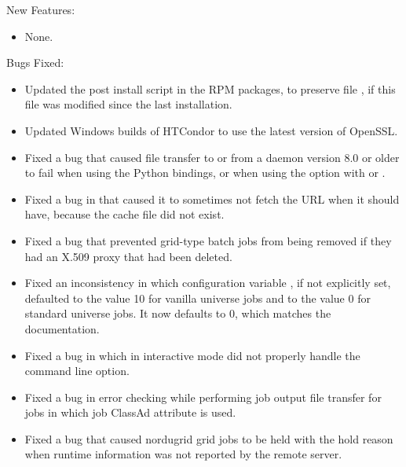 \noindent New Features:

\begin{itemize}

\item None.

\end{itemize}

\noindent Bugs Fixed:

\begin{itemize}

\item Updated the post install script in the RPM packages,
to preserve file , 
if this file was modified since the last installation.

\item Updated Windows builds of HTCondor to use the latest version of OpenSSL.

\item Fixed a bug that caused file transfer to or from a  
daemon version 8.0 or older
to fail when using the Python bindings, or when using
the  option with  or .

\item Fixed a bug in  that caused it to sometimes 
not fetch the URL when it should have,
because the cache file did not exist.

\item Fixed a bug that prevented grid-type batch jobs from being removed
if they had an X.509 proxy that had been deleted.

\item Fixed an inconsistency in which configuration variable
,
if not explicitly set, defaulted to the value 10 
for vanilla universe jobs and to the value 0 for standard universe jobs.
It now defaults to 0, which matches the documentation.

\item Fixed a bug in which  in interactive mode did
not properly handle the  command line option.

\item Fixed a bug in error checking while performing job output file
transfer for jobs in which job ClassAd attribute 
is used.

\item Fixed a bug that caused nordugrid grid jobs to be held with
the hold reason 
when runtime information was not reported by the remote server.

\end{itemize}


